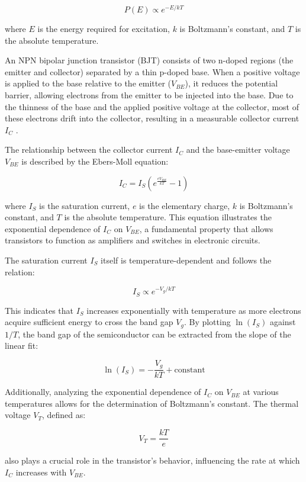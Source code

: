 \documentclass[12pt,letterpaper,twocolumn]{article}
\begin{document}
\[
P(E) \propto e^{-E/kT}
\]

where \( E \) is the energy required for excitation, \( k \) is Boltzmann’s constant, and \( T \) is the absolute temperature\cite{Thornton}.

An NPN bipolar junction transistor (BJT) consists of two n-doped regions (the emitter and collector) separated by a thin p-doped base. When a positive voltage is applied to the base relative to the emitter (\( V_{BE} \)), it reduces the potential barrier, allowing electrons from the emitter to be injected into the base. Due to the thinness of the base and the applied positive voltage at the collector, most of these electrons drift into the collector, resulting in a measurable collector current \( I_C \) \cite{Neudeck}.

The relationship between the collector current \( I_C \) and the base-emitter voltage \( V_{BE} \) is described by the Ebers-Moll equation:

\[
I_C = I_S \left(e^{\frac{eV_{BE}}{kT}} - 1\right)
\]

where \( I_S \) is the saturation current, \( e \) is the elementary charge, \( k \) is Boltzmann’s constant, and \( T \) is the absolute temperature. This equation illustrates the exponential dependence of \( I_C \) on \( V_{BE} \), a fundamental property that allows transistors to function as amplifiers and switches in electronic circuits\cite{Neudeck}.

The saturation current \( I_S \) itself is temperature-dependent and follows the relation:

\[
I_S \propto e^{-V_g/kT}
\]

This indicates that \( I_S \) increases exponentially with temperature as more electrons acquire sufficient energy to cross the band gap \( V_g \). By plotting \( \ln(I_S) \) against \( 1/T \), the band gap of the semiconductor can be extracted from the slope of the linear fit:

\[
\ln(I_S) = -\frac{V_g}{kT} + \text{constant}
\]

Additionally, analyzing the exponential dependence of \( I_C \) on \( V_{BE} \) at various temperatures allows for the determination of Boltzmann’s constant. The thermal voltage \( V_T \), defined as:

\[
V_T = \frac{kT}{e}
\]

also plays a crucial role in the transistor’s behavior, influencing the rate at which \( I_C \) increases with \( V_{BE} \)\cite{Collings1980}.
\end{document}
